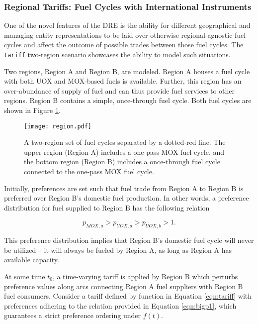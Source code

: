 \subsubsection{Regional Tariffs: Fuel Cycles with International Instruments}

One of the novel features of the DRE is the ability for different geographical
and managing entity representations to be laid over otherwise regional-agnostic
fuel cycles and affect the outcome of possible trades between those fuel
cycles. The \texttt{tariff} two-region scenario showcases the ability to model
such situations.

Two regions, Region A and Region B, are modeled. Region A houses a fuel cycle
with both UOX and MOX-based fuels is available. Further, this region has an
over-abundance of supply of fuel and can thus provide fuel services to other
regions. Region B contains a simple, once-through fuel cycle. Both fuel cycles
are shown in Figure \ref{fig:region}.

\begin{figure}
  \begin{center}
    \texttt{[image: region.pdf]}
    \caption[]{
      \label{fig:region}
      A two-region set of fuel cycles separated by a dotted-red line. The upper
      region (Region A) includes a one-pass MOX fuel cycle, and the bottom
      region (Region B) includes a once-through fuel cycle connected to the
      one-pass MOX fuel cycle.}
  \end{center}
\end{figure}

Initially, preferences are set such that fuel trade from Region A to
Region B is preferred over Region B's domestic fuel production. In other words, a
preference distribution for fuel supplied to Region B has the following
relation

\begin{equation}\label{eqn:bigdefault}
  p_{MOX, a} > p_{UOX, a} > p_{UOX, b} > 1.
\end{equation}

\noindent
This preference distribution implies that Region B's domestic fuel cycle will
never be utilized -- it will always be fueled by Region A, as long as Region A
has available capacity. 

At some time $t_0$, a time-varying tariff is applied by Region B which perturbs
preference values along arcs connecting Region A fuel suppliers with Region B
fuel consumers. Consider a tariff defined by function in Equation
\ref{eqn:tariff} with preferences adhering to the relation provided in Equation
\ref{eqn:bigp1}, which guarantees a strict preference ordering under $f(t)$.

